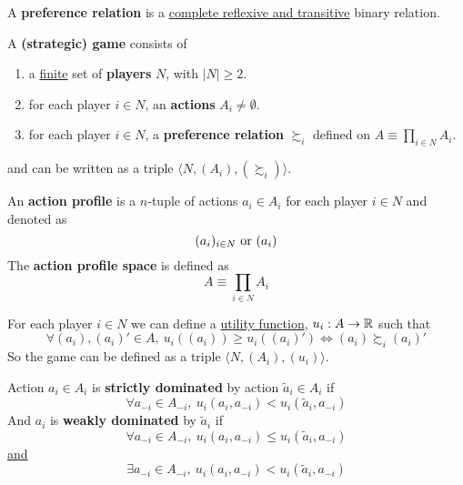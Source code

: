 \documentclass[11pt]{article}
\begin{document}
		\begin{definition}[pg.7]
			A \textbf{preference relation} is a \ul{complete reflexive and transitive} binary relation.
		\end{definition}
		
		\begin{definition}[11.1, lec.1]
			A \textbf{(strategic) game} consists of
			\begin{enumerate}[i]
				\item a \ul{finite} set of \textbf{players} $N$, with $|N| \geq 2$.
				\item for each player $i \in N$, an \textbf{actions} $A_i \neq \emptyset$.
				\item for each player $i \in N$, a \textbf{preference relation} $\succsim_i$ defined on $A \equiv \prod_{i\in N}A_i$.
			\end{enumerate}
			and can be written as a triple $\langle N, (A_i), (\succsim_i) \rangle$.
		\end{definition}

		\begin{definition}
			An \textbf{action profile} is a $n$-tuple of actions $a_i \in A_i$ for each player $i \in N$ and denoted as 
				\[
					(a_i)_{i \in N} \text{{ or }} (a_i)
				\]
			The \textbf{action profile space} is defined as 
				\[
					A \equiv \prod_{i \in N} A_i
				\]
		\end{definition}
		
		\begin{definition}
			For each player $i \in N$ we can define a \ul{utility function}, $u_i: A \to \mathbb{R}$ such that
			\begin{equation}
				\forall (a_i), (a_i)' \in A,\ u_i((a_i)) \geq u_i((a_i)') \iff (a_i) \succsim_i (a_i)'
			\end{equation}
			So the game can be defined as a triple $\langle N, (A_i), (u_i) \rangle$.
		\end{definition}
		
		\begin{definition}
			Action $a_i \in A_i$ is \textbf{strictly dominated} by action $\tilde{a}_i \in A_i$ if
			\[
				\forall a_{-i} \in A_{-i},\ u_i(a_i, a_{-i}) < u_i(\tilde{a}_i, a_{-i})
			\]
			And $a_i$ is \textbf{weakly dominated} by $\tilde{a}_i$ if
			\[
				\forall a_{-i} \in A_{-i},\ u_i(a_i, a_{-i}) \leq u_i(\tilde{a}_i, a_{-i})
			\]
			\ul{and}
			\[
				\exists a_{-i} \in A_{-i},\ u_i(a_i, a_{-i}) < u_i(\tilde{a}_i, a_{-i})
			\]
		\end{definition}
		
\end{document}
